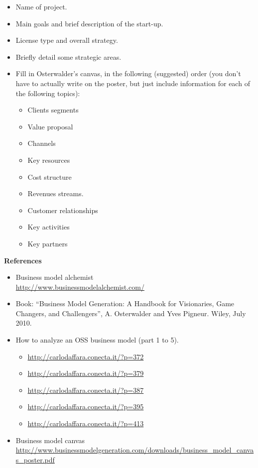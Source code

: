\documentclass[a4paper]{article}
\begin{document}
\begin{itemize}
\item Name of project.
\item Main goals and brief description of the start-up.
\item License type and overall strategy.
\item Briefly detail some strategic areas.
\item Fill in Osterwalder's canvas, in the following (suggested) order (you don't have to actually write on the poster, but just include information for each of the following topics):
  \begin{itemize}
  \item Clients segments
  \item Value proposal
  \item Channels
  \item Key resources
  \item Cost structure
  \item Revenues streams.
  \item Customer relationships
  \item Key activities
  \item Key partners
  \end{itemize}
\end{itemize}

\textbf{References}

\begin{itemize}
\item Business model alchemist \\
  \url{http://www.businessmodelalchemist.com/} 
\item Book: ``Business Model Generation: A Handbook for Visionaries, Game Changers, and Challengers'', A. Osterwalder and Yves Pigneur. Wiley, July 2010.
\item How to analyze an OSS business model (part 1 to 5).
  \begin{itemize}
  \item \url{http://carlodaffara.conecta.it/?p=372}
  \item \url{http://carlodaffara.conecta.it/?p=379}
  \item \url{http://carlodaffara.conecta.it/?p=387}
  \item \url{http://carlodaffara.conecta.it/?p=395}
  \item \url{http://carlodaffara.conecta.it/?p=413}
  \end{itemize}
\item Business model canvas \\
  \url{http://www.businessmodelgeneration.com/downloads/business_model_canvas_poster.pdf}
\end{itemize}
\end{document}
